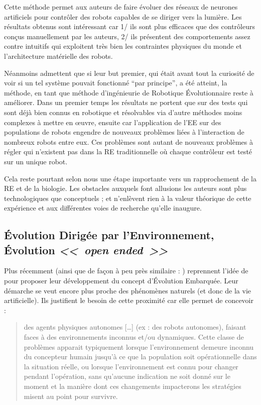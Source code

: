Cette méthode permet aux auteurs de faire évoluer des réseaux de neurones artificiels pour contrôler des robots capables de se diriger vers la lumière. Les résultats obtenus sont intéressant car 1/ ils sont plus efficaces que des contrôleurs conçus manuellement par les auteurs, 2/ ils présentent des comportements assez contre intuitifs qui exploitent très bien les contraintes physiques du monde et l'architecture matérielle des robots.

Néanmoins \cite{watson02embodiedevolutiondistributingevolutionaryalgorithmpopulationrobots} admettent que si leur but premier, qui était avant tout la curiosité de voir si un tel système pouvait fonctionné ``par principe'', a été atteint, la méthode, en tant que méthode d'ingénieurie de Robotique \'Evolutionnaire reste à améliorer. Dans un premier temps les résultats ne portent que sur des tests qui sont déjà bien connus en robotique et résolvables via d'autre méthodes moins complexes à mettre en {\oe}uvre, ensuite car l'application de l'EE sur des populations de robots engendre de nouveaux problèmes liées à l'interaction de nombreux robots entre eux. Ces problèmes sont autant de nouveaux problèmes à régler qui n'existent pas dans la RE traditionnelle où chaque contrôleur est testé sur un unique robot.

Cela reste pourtant selon nous une étape importante vers un rapprochement de la RE et de la biologie. Les obstacles auxquels font allusions les auteurs sont plus technologiques que conceptuels ; et n'enlèvent rien à la valeur théorique de cette expérience et aux différentes voies de recherche qu'elle inaugure.

\subsection{\'Evolution Dirigée par l'Environnement, \'Evolution \emph{<<~open ended~>>}}

Plus récemment \cite{bredeche11mcmds} (ainsi que de façon à peu près similaire : \cite{trueba11taskdrivenspeciesevolutionaryroboticteams}) reprennent l'idée de \cite{watson02embodiedevolutiondistributingevolutionaryalgorithmpopulationrobots} pour proposer leur développement du concept d'\'Evolution Embarquée. Leur démarche se veut encore plus proche des phénomènes naturels (et donc de la vie artificielle). Ils justifient le besoin de cette proximité car elle permet de concevoir : 
\begin{quotation}
	des agents physiques autonomes [\dots] (ex : des robots autonomes), faisant faces à des environnements inconnus et/ou dynamiques. Cette classe de problèmes apparait typiquement lorsque l'environnement demeure inconnu du concepteur humain jusqu'à ce que la population soit opérationnelle dans la situation réelle, ou lorsque l'environnement est connu pour changer pendant l'opération, sans qu'aucune indication ne soit donné sur le moment et la manière dont ces changements impacterons les stratégies misent au point pour survivre.
	\\\citep[p.1]{bredeche11mcmds}
\end{quotation}


